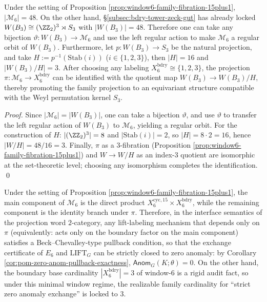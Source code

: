 \begin{corollary}[Weyl--Family Equipotence: Regular Orbit Realization of \texorpdfstring{$|\mathcal M_6|=|W(B_3)|$}{|M6|=|W|}]\label{cor:window6-weyl-family-equipotential}
Under the setting of Proposition \ref{prop:window6-family-fibration-15plus1}, \(|\mathcal M_6|=48\).
On the other hand, \S\ref{subsec:bdry-tower-zeck-gut} has already locked
\(
W(B_3)\cong (\ZZ_2)^3\rtimes S_3
\)
with \(|W(B_3)|=48\).
Therefore one can take any bijection \(\vartheta:W(B_3)\to\mathcal M_6\) and use the left regular action to make \(\mathcal M_6\) a regular orbit of \(W(B_3)\).
Furthermore, let \(p:W(B_3)\to S_3\) be the natural projection, and take \(H:=p^{-1}(\mathrm{Stab}(i))\) (\(i\in\{1,2,3\}\)), then \(|H|=16\) and \(|W(B_3)/H|=3\).
After choosing any labeling \(X_6^{\mathrm{bdry}}\cong\{1,2,3\}\), the projection \(\pi:\mathcal M_6\to X_6^{\mathrm{bdry}}\) can be identified with the quotient map \(W(B_3)\to W(B_3)/H\), thereby promoting the family projection to an equivariant structure compatible with the Weyl permutation kernel \(S_3\).
\end{corollary}
\begin{proof}
Since \(|\mathcal M_6|=|W(B_3)|\), one can take a bijection \(\vartheta\), and use \(\vartheta\) to transfer the left regular action of \(W(B_3)\) to \(\mathcal M_6\), yielding a regular orbit.
For the construction of \(H\): \(|(\ZZ_2)^3|=8\) and \(|\mathrm{Stab}(i)|=2\), so \(|H|=8\cdot 2=16\), hence \(|W/H|=48/16=3\).
Finally, \(\pi\) as a \(3\)-fibration (Proposition \ref{prop:window6-family-fibration-15plus1}) and \(W\to W/H\) as an index-\(3\) quotient are isomorphic at the set-theoretic level; choosing any isomorphism completes the identification. \qed
\end{proof}

\begin{corollary}\label{cor:window6-three-family-zero-anom}
Under the setting of Proposition \ref{prop:window6-family-fibration-15plus1}, the main component of \(\mathcal M_6\) is the direct product \(X_6^{\mathrm{cyc},15}\times X_6^{\mathrm{bdry}}\), while the remaining component is the identity branch under \(\pi\).
Therefore, in the interface semantics of the projection word \(2\)-category, any lift-labeling mechanism that depends only on \(\pi\) (equivalently: acts only on the boundary factor on the main component)
satisfies a Beck--Chevalley-type pullback condition, so that the exchange certificate of \(E_6\) and \(\mathrm{LIFT}_G\) can be strictly closed to zero anomaly:
by Corollary \ref{cor:pom-zero-anom-pullback-exactness}, \(\mathsf{Anom}_G(K;\theta)=0\).
On the other hand, the boundary base cardinality \(|X_6^{\mathrm{bdry}}|=3\) of window-\(6\) is a rigid audit fact,
so under this minimal window regime, the realizable family cardinality for ``strict zero anomaly exchange'' is locked to \(3\).
\end{corollary}

